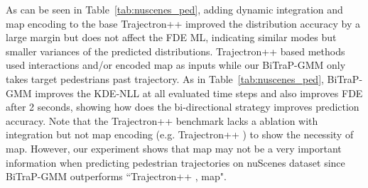 \documentclass[letterpaper, 10 pt, conference]{ieeeconf}
\begin{document}
 As can be seen in Table~\ref{tab:nuscenes_ped}, adding dynamic integration and map encoding to the base Trajectron++ improved the distribution accuracy by a large margin but does not affect the FDE ML, indicating similar modes but smaller variances of the predicted distributions. Trajectron++ based methods used interactions and/or encoded map as inputs while our BiTraP-GMM only takes target pedestrians past trajectory. As in Table~\ref{tab:nuscenes_ped}, BiTraP-GMM improves the KDE-NLL at all evaluated time steps and also improves FDE after 2 seconds, showing how does the bi-directional strategy improves prediction accuracy. Note that the Trajectron++ benchmark lacks a ablation with integration but not map encoding (e.g. Trajectron++ ) to show the necessity of map. However, our experiment shows that map may not be a very important information when predicting pedestrian trajectories on nuScenes dataset since BiTraP-GMM outperforms ``Trajectron++ , map".


 

\end{document}
